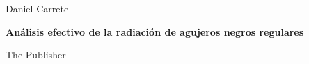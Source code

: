 \documentclass[a4paper,12pt]{book}
\newcommand*{\plogo}{\fbox{$\mathcal{L}$}} %
\begin{document}

\begin{titlepage} %

	\raggedleft %
	
	\vspace*{\baselineskip} %
	
	
	{\Large Daniel Carrete} %
	
	\vspace*{0.167\textheight} %
	
	
	\textbf{\LARGE Análisis efectivo de la radiación de
	agujeros negros regulares}\\[\baselineskip] %
	
	
	
	\vfill %
	
	
	{\large The Publisher~~\plogo} %
	
	\vspace*{3\baselineskip} %
\end{titlepage}

\tableofcontents



\printbibliography
\nocite{*}
\end{document}

